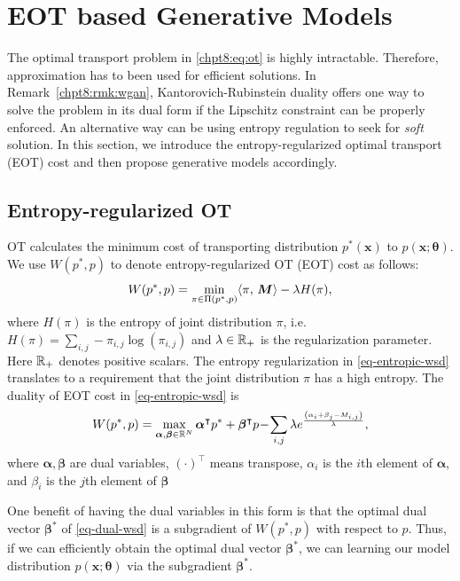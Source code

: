 \section{EOT based Generative Models}

The optimal transport problem in \eqref{chpt8:eq:ot} is highly intractable. Therefore, approximation has to been used for efficient solutions. In Remark~\ref{chpt8:rmk:wgan}, Kantorovich-Rubinstein duality offers one way to solve the problem in its dual form if the Lipschitz constraint can be properly enforced. An alternative way can be using entropy regulation to seek for \textit{soft} solution.  In this section, we introduce the entropy-regularized optimal transport (EOT) cost and then propose generative models accordingly.

\subsection{Entropy-regularized OT} 

OT calculates the minimum cost of transporting distribution $p^{\ast}(\bm{x})$ to $p(\bm{x}; \bm{\theta})$. We use $W(p^{\ast},p)$ to denote entropy-regularized OT (EOT) cost as follows:
\begin{equation}\label{eq-entropic-wsd}
  W(p^{\ast},p)=\min_{ \pi \in \Pi(p^{\ast}, p)} \langle \pi,\,\bm{M}\rangle - \lambda H(\pi),
\end{equation}
where $H(\pi)$ is the entropy of joint distribution $\pi$, i.e. $H(\pi) = \sum_{i,j} -\pi_{i,j}
\log(\pi_{i,j})$ and $\lambda \in \mathbb{R}_{+}$ is the regularization
parameter. Here $\mathbb{R}_{+}$ denotes positive scalars. The entropy regularization in \eqref{eq-entropic-wsd}  translates 
to a requirement that the joint distribution $\pi$ has a high entropy. 
 The duality of EOT cost in \eqref{eq-entropic-wsd} is
\begin{equation}\label{eq-dual-wsd}
  W(p^{\ast}, p)  =  \max_{\bm{\al}, \bm{\be} \in \mathbb{R}^{N}} \bm{\al}^{\intercal}p^{\ast} + \bm{\beta}^{\intercal}p \! - \!
  \sum_{i,j} \lambda e^{ \frac{{\left( \al_i + \beta_j - M_{i,j} \right)}}{\la} },\vspace{-2pt}
\end{equation}
where $\bm{\alpha},\bm{\beta}$ are dual variables, $(\cdot)^{\intercal}$ means transpose, $\alpha_i$ is the $i$th element of $\bm{\alpha}$, and $\beta_i$ is the $j$th element of $\bm{\beta}$

One benefit of having the dual variables in this form is that the optimal dual vector $\bm{\beta}^{\ast}$
of \eqref{eq-dual-wsd} is a subgradient of $W(p^{\ast},p)$ with respect to $p$. Thus, if we can efficiently obtain the optimal dual vector $\bm{\beta}^{\ast}$, we can learning our model distribution $p(\bm{x}; \bm{\theta})$ via the subgradient $\bm{\beta}^{\ast}$.

